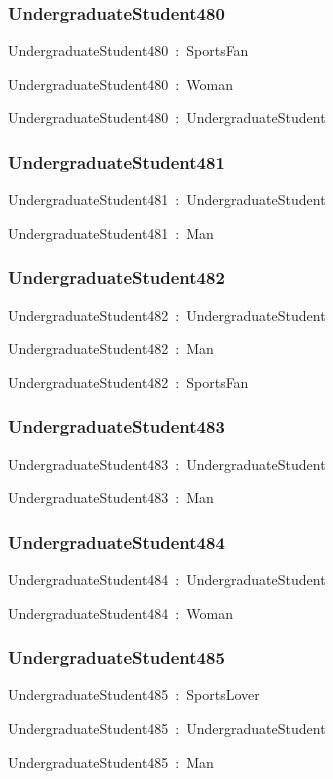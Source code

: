 \documentclass{article}
\begin{document}
\subsubsection*{UndergraduateStudent480}

UndergraduateStudent480~:~SportsFan

UndergraduateStudent480~:~Woman

UndergraduateStudent480~:~UndergraduateStudent

\subsubsection*{UndergraduateStudent481}

UndergraduateStudent481~:~UndergraduateStudent

UndergraduateStudent481~:~Man

\subsubsection*{UndergraduateStudent482}

UndergraduateStudent482~:~UndergraduateStudent

UndergraduateStudent482~:~Man

UndergraduateStudent482~:~SportsFan

\subsubsection*{UndergraduateStudent483}

UndergraduateStudent483~:~UndergraduateStudent

UndergraduateStudent483~:~Man

\subsubsection*{UndergraduateStudent484}

UndergraduateStudent484~:~UndergraduateStudent

UndergraduateStudent484~:~Woman

\subsubsection*{UndergraduateStudent485}

UndergraduateStudent485~:~SportsLover

UndergraduateStudent485~:~UndergraduateStudent

UndergraduateStudent485~:~Man
\end{document}

